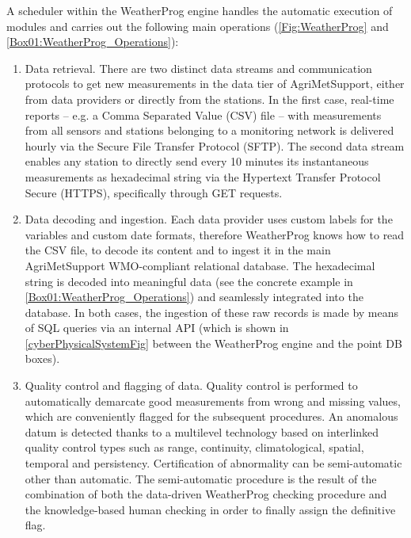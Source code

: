 \documentclass[authoryear,preprint,review,12pt]{elsarticle}
\newcommand{\statusblock}[3]{
    \ifthenelse{\equal{#2}{todo}}
        {\textcolor{red}{#1 (TO DO): #3}}
        {}
    \ifthenelse{\equal{#2}{wip}}
        {\textcolor{magenta}{#1 (IN PROGRESS): #3}}
        {}
    \ifthenelse{\equal{#2}{update}}
        {\textcolor{blue}{#1 (UPDATE): #3}}
        {}
    \ifthenelse{\equal{#2}{review}}
        {\textcolor{cyan}{#1 (REVIEW): #3}}
        {}
    \ifthenelse{\equal{#2}{done}}
        {\textcolor{PineGreen}{#1 (READY): #3}}
        {}
}
\begin{document}
A scheduler within the WeatherProg engine handles the automatic execution of modules and carries out the following main operations (\cref{Fig:WeatherProg} and \cref{Box01:WeatherProg_Operations}):
\begin{enumerate}
    \item Data retrieval. %
    There are two distinct data streams and communication protocols to get new measurements in the data tier of Agri\-Met\-Support, either from data providers or directly from the stations. 
    In the first case, real-time reports -- e.g. a Comma Separated Value (CSV) file -- with measurements from all sensors and stations belonging to a monitoring network is delivered hourly via the Secure File Transfer Protocol (SFTP).
    The second data stream enables any station to directly send every 10 minutes its instantaneous measurements as hexadecimal string via the Hypertext Transfer Protocol Secure (HTTPS), specifically through GET requests.
    
    \item Data decoding and ingestion. Each data provider uses custom labels for the variables and custom date formats, therefore WeatherProg knows how to read the CSV file, to decode its content and to ingest it in the main Agri\-Met\-Support WMO-compliant relational database. 
    The hexadecimal string is decoded into meaningful data (see the concrete example in \cref{Box01:WeatherProg_Operations}) and seamlessly integrated into the database.
    In both cases, the ingestion of these raw records is made by means of SQL queries via an internal API (which is shown in \cref{cyberPhysicalSystemFig} between the WeatherProg engine and the point DB boxes).

    \item Quality control and flagging of data. Quality control is performed to automatically demarcate good measurements from wrong and missing values, which are conveniently flagged for the subsequent procedures.
    An anomalous datum is detected thanks to a multilevel technology based on interlinked quality control types such as range, continuity, climatological, spatial, temporal and persistency.
    Certification of abnormality can be semi-automatic other than automatic.
    The semi-automatic procedure is the result of the combination of both the data-driven WeatherProg checking procedure and the knowledge-based human checking in order to finally assign the definitive flag.


\end{enumerate}
\end{document}
